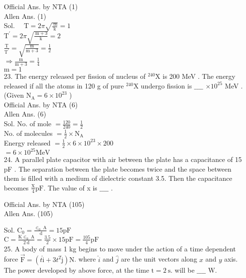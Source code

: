 \documentclass[10pt]{article}
\begin{document}
Official Ans. by NTA (1)\\
Allen Ans. (1)\\
Sol. \(\quad \mathrm{T}=2 \pi \sqrt{\frac{\mathrm{~m}}{\mathrm{k}}}=1\)\\
\(\mathrm{T}^{\prime}=2 \pi \sqrt{\frac{\mathrm{~m}+3}{\mathrm{k}}}=2\)\\
\(\frac{\mathrm{T}}{\mathrm{T}^{\prime}}=\sqrt{\frac{\mathrm{m}}{\mathrm{m}+3}}=\frac{1}{2}\)\\
\(\Rightarrow \frac{\mathrm{m}}{\mathrm{m}+3}=\frac{1}{4}\)\\
\(\mathrm{m}=1\)\\
23. The energy released per fission of nucleus of \({ }^{240} \mathrm{X}\) is 200 MeV . The energy released if all the atoms in 120 g of pure \({ }^{240} \mathrm{X}\) undergo fission is \(\_\_\_\_\) \(\times 10^{25}\) MeV .\\
(Given \(\mathrm{N}_{\mathrm{A}}=6 \times 10^{23}\) )\\
Official Ans. by NTA (6)\\
Allen Ans. (6)\\
Sol. No. of mole \(=\frac{120}{240}=\frac{1}{2}\)\\
No. of molecules \(=\frac{1}{2} \times \mathrm{N}_{\mathrm{A}}\)\\
Energy released \(=\frac{1}{2} \times 6 \times 10^{23} \times 200\)\\
\(=6 \times 10^{25} \mathrm{MeV}\)\\
24. A parallel plate capacitor with air between the plate has a capacitance of 15 pF . The separation between the plate becomes twice and the space between them is filled with a medium of dielectric constant 3.5. Then the capacitance becomes \(\frac{\mathrm{X}}{4} \mathrm{pF}\). The value of x is \(\_\_\_\_\) .

Official Ans. by NTA (105)\\
Allen Ans. (105)

Sol. \(\mathrm{C}_{0}=\frac{\in_{0} \mathrm{~A}}{\mathrm{~d}}=15 \mathrm{pF}\)\\
\(\mathrm{C}=\frac{\mathrm{K} \in_{0} \mathrm{~A}}{2 \mathrm{~d}}=\frac{3.5}{2} \times 15 \mathrm{pF}=\frac{105}{4} \mathrm{pF}\)\\
25. A body of mass 1 kg begins to move under the action of a time dependent force \(\overrightarrow{\mathrm{F}}=\left(t \hat{\mathrm{i}}+3 t^{2} \hat{\mathrm{j}}\right) \mathrm{N}\). where \(\hat{i}\) and \(\hat{j}\) are the unit vectors along \(x\) and \(y\) axis. The power developed by above force, at the time \(\mathrm{t}=2 \mathrm{~s}\). will be \(\_\_\_\_\) W.
\end{document}

